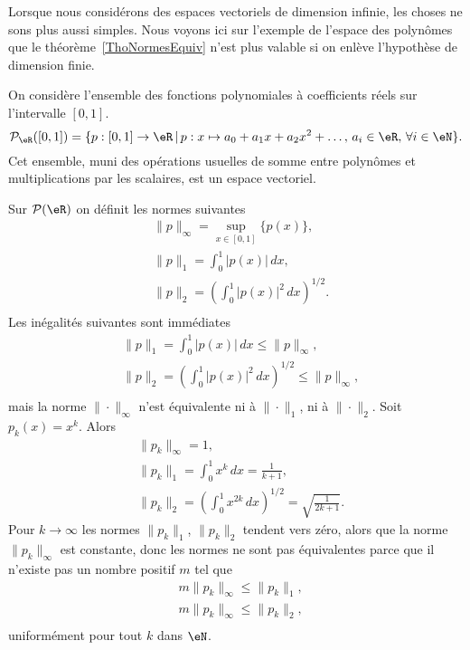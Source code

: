 Lorsque nous considérons des espaces vectoriels de dimension infinie, les choses ne sons plus aussi simples. Nous voyons ici sur l'exemple de l'espace des polynômes que le théorème~\ref{ThoNormesEquiv} n'est plus valable si on enlève l'hypothèse de dimension finie.

On considère l'ensemble des fonctions polynomiales à coefficients réels sur  l'intervalle $[0,1]$.
\begin{equation}
\mathcal{P}_\eR([0,1])=\{p:[0,1]\to \eR\,|\, p : x\mapsto a_0+a_1 x +a_2 x^2 + \ldots, \, a_i\in\eR,\,\forall i\in \eN\}.
\end{equation}
Cet ensemble, muni des opérations usuelles de somme entre polynômes et multiplications par les scalaires, est un espace vectoriel.

Sur $\mathcal{P}(\eR)$ on définit les normes suivantes
\begin{equation}
\begin{aligned}
&\|p\|_\infty=\sup_{x\in[0,1]}\{p(x)\},\\
&\|p\|_1 =\int_0^1|p(x)|\, dx,\\
&\|p\|_2 =\left(\int_0^1|p(x)|^2\, dx\right)^{1/2}.\\
\end{aligned}
\end{equation}
Les inégalités suivantes sont  immédiates
\begin{equation}
\begin{aligned}
&\|p\|_1 =\int_0^1|p(x)|\, dx\leq \|p\|_\infty,\\
&\|p\|_2 =\left(\int_0^1|p(x)|^2\, dx\right)^{1/2}\leq \|p\|_\infty,\\
\end{aligned}
\end{equation}
mais la norme $\|\cdot\|_\infty$ n'est  équivalente ni à $\|\cdot\|_1$, ni à $\|\cdot\|_2$. Soit $p_k(x)= x^k$. Alors
\begin{equation}
\begin{aligned}
&\|p_k\|_\infty=1,\\
&\|p_k\|_1 =\int_0^1x^k\, dx=  \frac{1}{k+1},\\
&\|p_k\|_2 =\left(\int_0^1x^{2k}\, dx\right)^{1/2}=\sqrt{\frac{1}{2k+1}}.
\end{aligned}
\end{equation}
Pour $k\to \infty$ les normes $\|p_k\|_1$, $\|p_k\|_2$ tendent vers zéro, alors que la norme $\|p_k\|_\infty$ est constante, donc les normes ne sont pas équivalentes parce que il n'existe pas un nombre positif $m$ tel que
\begin{equation}
\begin{aligned}
& m \|p_k\|_\infty\leq \|p_k\|_1 ,\\
& m \|p_k\|_\infty\leq \|p_k\|_2 ,\\
\end{aligned}
\end{equation}
uniformément pour tout $k$ dans $\eN$.

